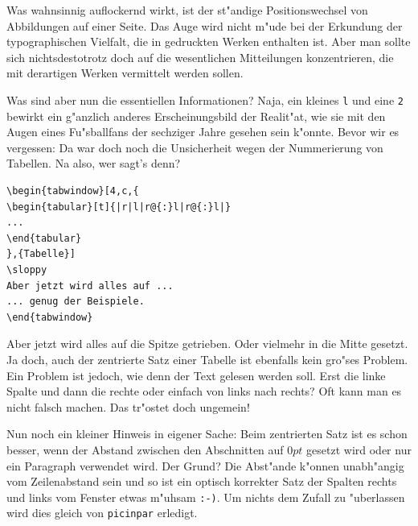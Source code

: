 \documentclass[a4paper]{article}
\begin{document}
Was wahnsinnig auflockernd wirkt, ist der st"andige Positionswechsel
von Abbildungen auf einer Seite. Das Auge wird nicht m"ude bei
der Erkundung der typographischen Vielfalt, die in gedruckten
Werken enthalten ist. Aber man sollte sich nichtsdestotrotz doch
auf die wesentlichen Mitteilungen konzentrieren, die mit derartigen
Werken vermittelt werden sollen.

Was sind aber nun die essentiellen Informationen? Naja, ein kleines
{\tt l} und eine {\tt 2} bewirkt ein g"anzlich anderes Erscheinungsbild
der Realit"at, wie sie mit den Augen eines Fu"sballfans der sechziger
Jahre gesehen sein k"onnte. Bevor wir es vergessen: Da war doch noch
die Unsicherheit wegen der Nummerierung von Tabellen. Na also, wer
sagt's denn?
\end{tabwindow}

\begin{verbatim}
\begin{tabwindow}[4,c,{
\begin{tabular}[t]{|r|l|r@{:}l|r@{:}l|}
...
\end{tabular}
},{Tabelle}]
\sloppy
Aber jetzt wird alles auf ...
... genug der Beispiele.
\end{tabwindow}
\end{verbatim}

\sloppy
Aber jetzt wird alles auf die Spitze getrieben. Oder vielmehr
in die Mitte gesetzt. Ja doch, auch der zentrierte Satz einer Tabelle
ist ebenfalls kein gro"ses Problem. Ein Problem ist jedoch, wie denn
der Text gelesen werden soll. Erst die linke Spalte und dann die
rechte oder einfach von links nach rechts? Oft kann man es nicht
falsch machen. Das tr"ostet doch ungemein!

Nun noch ein kleiner Hinweis in eigener Sache:
Beim zentrierten Satz ist es schon besser, wenn der Abstand zwischen
den Abschnitten auf $0pt$ gesetzt wird oder nur ein Paragraph verwendet
wird. Der Grund? Die Abst"ande k"onnen unabh"angig vom Zeilenabstand
sein und so ist ein optisch korrekter Satz der Spalten rechts und
links vom Fenster etwas m"uhsam {\tt :-)}. Um nichts dem Zufall zu
"uberlassen wird dies gleich von {\tt picinpar} erledigt.
\end{tabwindow}
\end{document}
